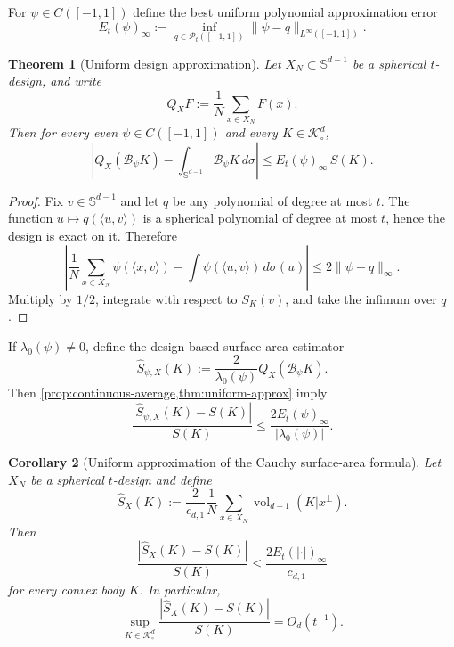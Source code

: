 \documentclass[12pt,a4paper]{article}
\newcommand{\Sph}{\mathbb S}
\newcommand{\K}{\mathcal K}
\newcommand{\cB}{\mathcal B}
\theoremstyle{plain}
\newtheorem{theorem}{Theorem}[section]
\newtheorem{corollary}[theorem]{Corollary}
\theoremstyle{definition}
\begin{document}
For $\psi\in C([-1,1])$ define the best uniform polynomial approximation error
\begin{equation}\label{eq:Et}
 E_t(\psi)_\infty
 :=\inf_{q\in\mathcal P_t([-1,1])}
 \|\psi-q\|_{L^\infty([-1,1])}.
\end{equation}

\begin{theorem}[Uniform design approximation]\label{thm:uniform-approx}
Let $X_N\subset\Sph^{d-1}$ be a spherical $t$-design, and write
\[
 Q_XF:=\frac1N\sum_{x\in X_N}F(x).
\]
Then for every even $\psi\in C([-1,1])$ and every $K\in\K^d_\circ$,
\begin{equation}\label{eq:uniform-approx}
 \left|
 Q_X(\cB_\psi K)
 -\int_{\Sph^{d-1}}\cB_\psi K\,d\sigma
 \right|
 \le E_t(\psi)_\infty\,S(K).
\end{equation}
\end{theorem}

\begin{proof}
Fix $v\in\Sph^{d-1}$ and let $q$ be any polynomial of degree at most $t$.  The function $u\mapsto q(\langle u,v\rangle)$ is a spherical polynomial of degree at most $t$, hence the design is exact on it.  Therefore
\[
 \left|
 \frac1N\sum_{x\in X_N}\psi(\langle x,v\rangle)
 -\int\psi(\langle u,v\rangle)\,d\sigma(u)
 \right|
 \le2\|\psi-q\|_\infty.
\]
Multiply by $1/2$, integrate with respect to $S_K(v)$, and take the infimum over $q$.
\end{proof}

If $\lambda_0(\psi)\ne0$, define the design-based surface-area estimator
\begin{equation}\label{eq:surface-estimator-general}
 \widehat S_{\psi,X}(K)
 :=\frac{2}{\lambda_0(\psi)}Q_X(\cB_\psi K).
\end{equation}
Then \cref{prop:continuous-average,thm:uniform-approx} imply
\begin{equation}\label{eq:relative-general}
 \frac{|\widehat S_{\psi,X}(K)-S(K)|}{S(K)}
 \le\frac{2E_t(\psi)_\infty}{|\lambda_0(\psi)|}.
\end{equation}

\begin{corollary}[Uniform approximation of the Cauchy surface-area formula]\label{cor:cauchy-approx}
Let $X_N$ be a spherical $t$-design and define
\begin{equation}\label{eq:cauchy-estimator}
 \widehat S_X(K)
 :=\frac{2}{c_{d,1}}\frac1N\sum_{x\in X_N}\operatorname{vol}_{d-1}(K|x^\perp).
\end{equation}
Then
\begin{equation}\label{eq:cauchy-relative}
 \boxed{
 \frac{|\widehat S_X(K)-S(K)|}{S(K)}
 \le\frac{2E_t(|\cdot|)_\infty}{c_{d,1}}
 }
\end{equation}
for every convex body $K$.
In particular,
\begin{equation}\label{eq:cauchy-Ot}
 \sup_{K\in\K^d_\circ}
 \frac{|\widehat S_X(K)-S(K)|}{S(K)}
 =O_d(t^{-1}).
\end{equation}
\end{corollary}
\end{document}
